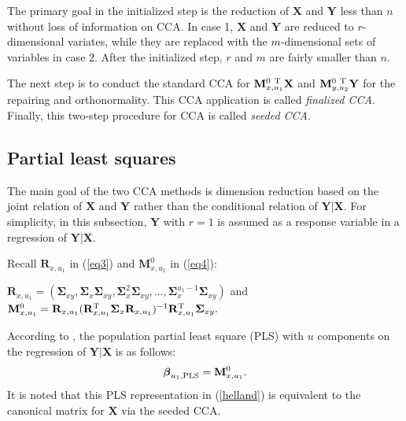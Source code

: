 The primary goal in the initialized step is
the reduction of $\mathbf{X}$ and $\mathbf{Y}$
less than $n$ without loss of information on CCA.
In case 1, $\mathbf{X}$ and $\mathbf{Y}$
are reduced to $r$-dimensional variates,
while they are replaced with the $m$-dimensional sets of variables in case 2.
After the initialized step, $r$ and $m$ are fairly smaller than $n$.

The next step is to conduct the standard CCA for
${\mathbf{M}}_{x,u_1}^{0~{\rm T}}\mathbf{X}$ and
${\mathbf{M}}_{y,u_2}^{0~{\rm T}}\mathbf{Y}$
for the repairing and orthonormality.
This CCA application is called \textit{finalized CCA}.
Finally, this two-step procedure for CCA is called \textit{seeded CCA}.

\subsection{Partial least squares}
The main goal of the two CCA methods is dimension reduction
based on the joint relation of $\mathbf{X}$ and $\mathbf{Y}$
rather than the conditional relation of $\mathbf{Y}|\mathbf{X}$.
For simplicity, in this subsection,  $\mathbf{Y}$ with $r=1$ is
assumed as a response variable in a regression of $\mathbf{Y}|\mathbf{X}$.

Recall $\mathbf{R}_{x,u_1}$  in (\ref{eq3}) and
${\mathbf{M}}_{x,u_1}^{0}$ in (\ref{eq4}):
%
\begin{center}
$\mathbf{R}_{x,u_1} = ({\boldsymbol{\Sigma}}_{xy},
{\boldsymbol{\Sigma}}_x{\boldsymbol{\Sigma}}_{xy},
{\boldsymbol{\Sigma}}_x^2{\boldsymbol{\Sigma}}_{xy},
\ldots, {\boldsymbol{\Sigma}}_x^{u_1 -1}{\boldsymbol{\Sigma}}_{xy})$ and
${\mathbf{M}}_{x,u_1}^{0} = \mathbf{R}_{x,u_1}
(\mathbf{R}_{x,u_1}^{{\rm {T}}}{\boldsymbol{\Sigma}}_{x}
\mathbf{R}_{x,u_1})^{-1}\mathbf{R}_{x,u_1}^{{\rm {T}}}
{\boldsymbol{\Sigma}}_{xy}.$
\end{center}
%

According to \cite{pls},
the population partial least square (PLS) with $u$ components
on the regression of $\mathbf{Y}|\mathbf{X}$ is as follows:
%
\begin{equation}
\boldsymbol{\beta}_{u_1,{\rm PLS}} = {\mathbf{M}}_{x,u_1}^{0}.
\label{helland}
\end{equation}
%
It is noted that this PLS representation in (\ref{helland}) is equivalent to
the canonical matrix for $\mathbf{X}$ via the seeded CCA.

